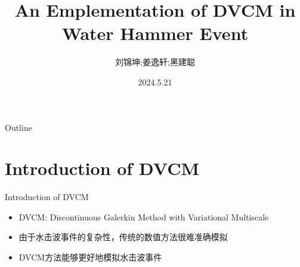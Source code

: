 \documentclass[UTF8]{ctexbeamer}
\title{An Emplementation of DVCM in Water Hammer Event}
\author{刘锦坤;姜逸轩;黑建聪}
\date{2024.5.21}
\begin{document}
\begin{frame}
    \titlepage
\end{frame}

\begin{frame}{Outline}
    \tableofcontents
\end{frame}

\section{Introduction of DVCM}
\begin{frame}{Introduction of DVCM}
    \begin{itemize}
        \item DVCM: Discontinuous Galerkin Method with Variational Multiscale
        \item 由于水击波事件的复杂性，传统的数值方法很难准确模拟
        \item DVCM方法能够更好地模拟水击波事件
    \end{itemize}
\end{frame}
\end{document}
